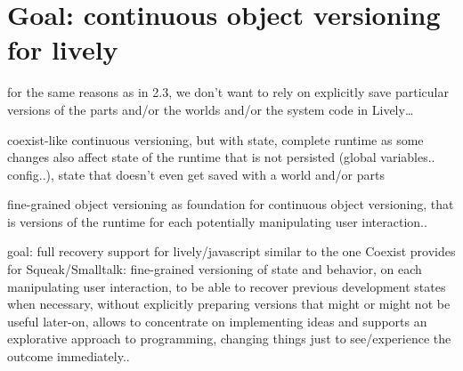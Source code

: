 \section{Goal: continuous object versioning for lively}

for the same reasons as in 2.3, we don’t want to rely on explicitly save particular versions of the parts and/or the worlds and/or the system code in Lively…

coexist-like continuous versioning, but with state, complete runtime as some changes also affect state of the runtime that is not persisted (global variables.. config..), state that doesn’t even get saved with a world and/or parts

fine-grained object versioning as foundation for continuous object versioning, that is versions of the runtime for each potentially manipulating user interaction..

goal: full recovery support for lively/javascript similar to the one Coexist provides for Squeak/Smalltalk: fine-grained versioning of state and behavior, on each manipulating user interaction, to be able to recover previous development states when necessary, without explicitly preparing versions that might or might not be useful later-on, allows to concentrate on implementing ideas and supports an explorative approach to programming, changing things just to see/experience the outcome immediately..
